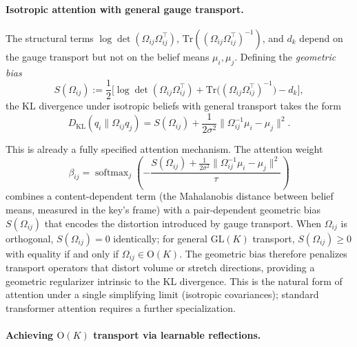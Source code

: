 \documentclass[twoside,11pt]{article}
\begin{document}
\paragraph{Isotropic attention with general gauge transport.}

The structural terms $\log\det(\Omega_{ij}\Omega_{ij}^\top)$, $\mathrm{Tr}((\Omega_{ij}\Omega_{ij}^\top)^{-1})$, and $d_k$ depend on the gauge transport but not on the belief means $\mu_i, \mu_j$. Defining the \emph{geometric bias}
\begin{equation}
S(\Omega_{ij}) := \frac{1}{2}\Big[\log\det(\Omega_{ij}\Omega_{ij}^\top) + \mathrm{Tr}\big((\Omega_{ij}\Omega_{ij}^\top)^{-1}\big) - d_k\Big],
\label{eq:geometric_bias}
\end{equation}
the KL divergence under isotropic beliefs with general transport takes the form
\begin{equation}
D_{\mathrm{KL}}(q_i \| \Omega_{ij} q_j) = S(\Omega_{ij}) + \frac{1}{2\sigma^2}\|\Omega_{ij}^{-1}\mu_i - \mu_j\|^2.
\label{eq:isotropic_general_omega}
\end{equation}

This is already a fully specified attention mechanism. The attention weight
\begin{equation}
\beta_{ij} = \operatorname{softmax}_j \left(-\frac{S(\Omega_{ij}) + \frac{1}{2\sigma^2}\|\Omega_{ij}^{-1}\mu_i - \mu_j\|^2}{\tau}\right)
\label{eq:general_isotropic_attention}
\end{equation}
combines a content-dependent term (the Mahalanobis distance between belief means, measured in the key's frame) with a pair-dependent geometric bias $S(\Omega_{ij})$ that encodes the distortion introduced by gauge transport. When $\Omega_{ij}$ is orthogonal, $S(\Omega_{ij}) = 0$ identically; for general $\mathrm{GL}(K)$ transport, $S(\Omega_{ij}) \geq 0$ with equality if and only if $\Omega_{ij} \in \mathrm{O}(K)$. The geometric bias therefore penalizes transport operators that distort volume or stretch directions, providing a geometric regularizer intrinsic to the KL divergence. This is the natural form of attention under a single simplifying limit (isotropic covariances); standard transformer attention requires a further specialization.

\paragraph{Achieving $\mathrm{O}(K)$ transport via learnable reflections.}
\label{par:ok_transport}
\end{document}
